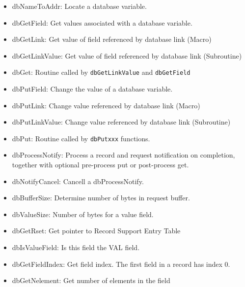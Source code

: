 \begin{itemize}
\item dbNameToAddr: Locate a database variable.



\item dbGetField: Get values associated with a database variable.

\item dbGetLink: Get value of field referenced by database link (Macro)

\item dbGetLinkValue: Get value of field referenced by database link (Subroutine)

\item dbGet: Routine called by \verb|dbGetLinkValue| and \verb|dbGetField|

\item dbPutField: Change the value of a database variable.

\item dbPutLink: Change value referenced by database link (Macro)

\item dbPutLinkValue: Change value referenced by database link (Subroutine)

\item dbPut: Routine called by \verb|dbPutxxx| functions.

\item dbProcessNotify: Process a record and request notification on completion, together with optional pre-process put or post-process get.

\item dbNotifyCancel: Cancell a dbProcessNotify.

\item dbBufferSize: Determine number of bytes in request buffer.

\item dbValueSize: Number of bytes for a value field.

\item dbGetRset: Get pointer to Record Support Entry Table

\item dbIsValueField: Is this field the VAL field.

\item dbGetFieldIndex: Get field index. The first field in a record has index 0.

\item dbGetNelement: Get number of elements in the field


\end{itemize}

